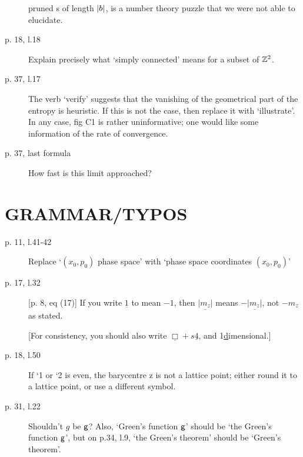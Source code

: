 \documentclass[12pt]{iopart}
\begin{document}
\begin{description}
{pruned {\brick s} of length  ${|b|}$, is a number theory puzzle that
we were not able to elucidate.
    }
  \item[p. 18, l.18]
Explain precisely what `simply connected' means for a subset of $\mathbb{Z}^{2}$.
  \item[p. 37, l.17]
The verb `verify' suggests that the vanishing of the geometrical part of
the entropy is heuristic. If this is not the case, then replace it with
`illustrate'. In any case, fig C1 is rather uninformative; one would like
some information of the rate of convergence.
  \item[p. 37, last formula] How fast is this limit approached?
\end{description}



\section*{GRAMMAR/TYPOS}

\begin{description}
  \item[p. 11, l.41-42]
Replace `$(x_0,p_0)$ phase space' with `phase space coordinates $(x_0,p_0)$'
  \item[p. 17, l.32] [p. 8, eq (17)] If you write $\underline{1}$ to mean $-1$,
then $\underline{|m_z|}$ means $-\underline{|m_z|}$, not $-m_z$
as stated.

[For consistency, you should also write $\underline{\Box} + s\underline{4}$,
and 1\underline{d}imensional.]

  \item[p. 18, l.50]
If `1 or `2 is even, the barycentre z is not a lattice point; either
round it to a lattice point, or use a different symbol.

  \item[p. 31, l.22] Shouldn't $g$ be $\mathsf{g}$?
Also, `Green's function $\mathsf{g}$' should be `the Green's function
$\mathsf{g}$', but on p.34, l.9, `the Green's theorem' should be `Green's theorem'.
\end{description}



\printbibliography[
heading=bibintoc,
title={References}
				  ] %
\end{document}
